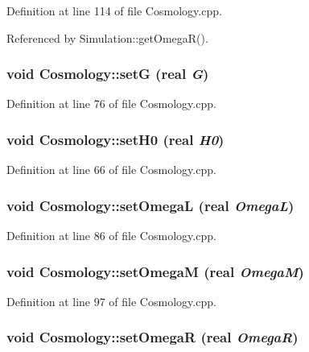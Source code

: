 Definition at line 114 of file Cosmology.cpp.



Referenced by Simulation::getOmegaR().

\subsubsection[{setG}]{\setlength{\rightskip}{0pt plus 5cm}void Cosmology::setG ({\bf real} {\em G})}\label{classCosmology_a492150261f6b3717cf2c22bd3058908a}


Definition at line 76 of file Cosmology.cpp.

\subsubsection[{setH0}]{\setlength{\rightskip}{0pt plus 5cm}void Cosmology::setH0 ({\bf real} {\em H0})}\label{classCosmology_a40349514dde1ba14eb7ec052989cdd04}


Definition at line 66 of file Cosmology.cpp.

\subsubsection[{setOmegaL}]{\setlength{\rightskip}{0pt plus 5cm}void Cosmology::setOmegaL ({\bf real} {\em OmegaL})}\label{classCosmology_a6efc081201eee3de624ce776d24ddd42}


Definition at line 86 of file Cosmology.cpp.

\subsubsection[{setOmegaM}]{\setlength{\rightskip}{0pt plus 5cm}void Cosmology::setOmegaM ({\bf real} {\em OmegaM})}\label{classCosmology_a30a53cfb18962531ddb58ec3746d817c}


Definition at line 97 of file Cosmology.cpp.

\subsubsection[{setOmegaR}]{\setlength{\rightskip}{0pt plus 5cm}void Cosmology::setOmegaR ({\bf real} {\em OmegaR})}\label{classCosmology_a78936b436ca3c5fd1cfc4154cd695941}


